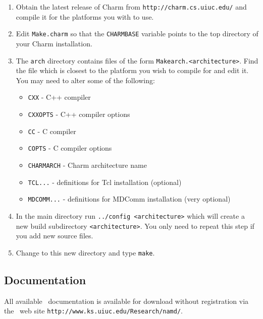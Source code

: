 \begin{enumerate}
\item
Obtain the latest release of Charm from {\tt http://charm.cs.uiuc.edu/}
and compile it for the platforms you with to use.
\item
Edit {\tt Make.charm} so that the {\tt CHARMBASE} variable
points to the top directory of your Charm installation.
\item 
The {\tt arch} directory contains files of the form {\tt Makearch.<architecture>}.
Find the file which is closest to the platform you wish to compile for and
edit it.  You may need to alter some of the following:
\begin{itemize}
\item {\tt CXX} - C++ compiler
\item {\tt CXXOPTS} - C++ compiler options
\item {\tt CC} - C compiler
\item {\tt COPTS} - C compiler options
\item {\tt CHARMARCH} - Charm architecture name
\item {\tt TCL...} - definitions for Tcl installation (optional)
\item {\tt MDCOMM...} - definitions for MDComm installation (very optional)
\end{itemize}
\item
In the main directory run {\tt ../config <architecture>}
which will create a new build subdirectory {\tt <architecture>}.
You only need to repeat this step if you add new source files.
\item 
Change to this new directory and type {\tt make}.
\end{enumerate}

\subsection{Documentation}

All available \NAMD\ documentation is available for download without
registration via the \NAMD\ web site
{\tt http://www.ks.uiuc.edu/Research/namd/}.


